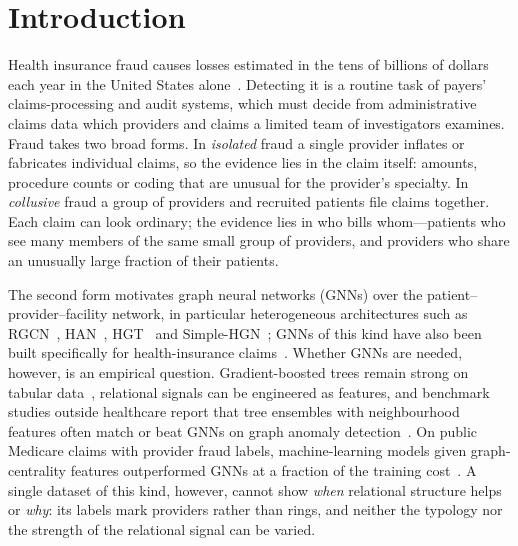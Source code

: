 \documentclass[pdflatex,sn-vancouver-num]{sn-jnl}
\begin{document}

\maketitle

\section{Introduction}\label{sec:intro}

Health insurance fraud causes losses estimated in the tens of billions of
dollars each year in the United States alone~\cite{nhcaa}. Detecting it is a
routine task of payers' claims-processing and audit systems, which must decide
from administrative claims data which providers and claims a limited team of
investigators examines. Fraud takes two broad forms. In \emph{isolated} fraud a single provider inflates or
fabricates individual claims, so the evidence lies in the claim itself:
amounts, procedure counts or coding that are unusual for the provider's
specialty. In \emph{collusive} fraud a group of providers and recruited
patients file claims together. Each claim can look ordinary; the evidence
lies in who bills whom---patients who see many members of the same small
group of providers, and providers who share an unusually large fraction of
their patients.

The second form motivates graph neural networks (GNNs) over the
patient--provider--facility network, in particular heterogeneous
architectures such as RGCN~\cite{schlichtkrull2018}, HAN~\cite{wang2019han},
HGT~\cite{hu2020hgt} and Simple-HGN~\cite{lv2021}; GNNs of this kind have
also been built specifically for health-insurance
claims~\cite{lu2023,hong2024,muhammad2025}.
Whether GNNs are needed, however, is an empirical question. Gradient-boosted
trees remain strong on tabular data~\cite{grinsztajn2022}, relational signals
can be engineered as features, and benchmark studies outside healthcare report
that tree ensembles with neighbourhood features often match or beat GNNs on
graph anomaly detection~\cite{weber2019elliptic,tang2023gadbench}. On public
Medicare claims with provider fraud labels, machine-learning models given
graph-centrality features outperformed GNNs at a fraction of the training
cost~\cite{yoo2023}. A single dataset of this kind, however, cannot show
\emph{when} relational structure helps or \emph{why}: its labels mark
providers rather than rings, and neither the typology nor the strength of
the relational signal can be varied.
\end{document}
